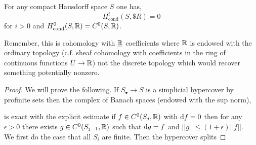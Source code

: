 \documentclass[12pt]{article}
\newcommand{\cond}{\text{cond}}
\begin{document}
\begin{theorem}
For any compact Hausdorff space $S$ one has,
\[ H^i_{\cond}(S, \$R) = 0 \]
for $i > 0$ and $H^0_{\cond}(S, \RR) = C^0(S, \RR)$.
\end{theorem}

\begin{rmk}
Remember, this is cohomology with $\underline{\mathbb{R}}$ coefficients where $\mathbb{R}$ is endowed with the ordinary topology (c.f. sheaf cohomology with coefficients in the ring of continuous functions $U \to \mathbb{R}$) not the discrete topology which would recover something potentially nonzero.
\end{rmk}

\begin{proof}
We will prove the following. If $S_\bullet \to S$ is a simplicial hypercover by profinite sets then the complex of Banach spaces (endowed with the sup norm),
\begin{center}
\end{center}
is exact with the explicit estimate if $f \in C^0(S_j, \mathbb{R})$ with $\mathrm{d}{f} = 0$ then for any $\epsilon > 0$ there exists $g \in C^0(S_{j-1}, \mathbb{R})$ such that $\mathrm{d}{g} = f$ and $||g|| \le (1 + \epsilon) || f ||$.
\bigskip\\
We first do the case that all $S_i$ are finite. Then the hypercover splits 
\end{proof}
\end{document}

